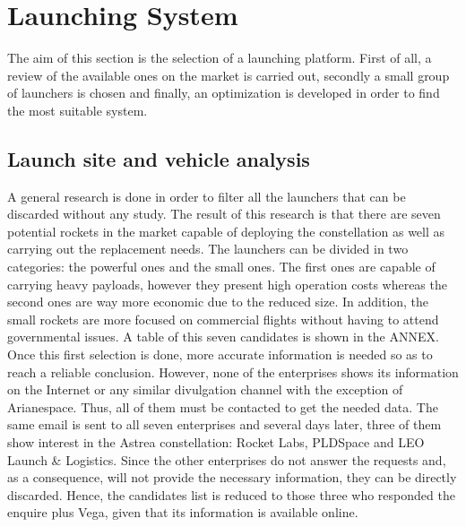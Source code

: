 
\section{Launching System}
The aim of this section is the selection of a launching platform. First of all, a review of the available ones on the market is carried out, secondly a small group of launchers is chosen and finally, an optimization is developed in order to find the most suitable system. 
	\subsection{Launch site and vehicle analysis}
A general research is done in order to filter all the launchers that can be discarded without any study. The result of this research is that there are seven potential rockets in the market capable of deploying the constellation as well as carrying out the replacement needs. The launchers can be divided in two categories: the powerful ones and the small ones. The first ones are capable of carrying heavy payloads, however they present high operation costs whereas the second ones are way more economic due to the reduced size. In addition, the small rockets are more focused on commercial flights without having to attend governmental issues. A table of this seven candidates is shown in the ANNEX.
\newline
Once this first selection is done, more accurate information is needed so as to reach a reliable conclusion. However, none of the enterprises shows its information on the Internet or any similar divulgation channel with the exception of Arianespace. Thus, all of them must be contacted to get the needed data. The same email is sent to all seven enterprises and several days later, three of them show interest in the Astrea constellation: Rocket Labs, PLDSpace and LEO Launch \& Logistics. Since the other enterprises do not answer the requests and, as a consequence, will not provide the necessary information, they can be directly discarded. Hence, the candidates list is reduced to those three who responded the enquire plus Vega, given that its information is available online. 
\newline
